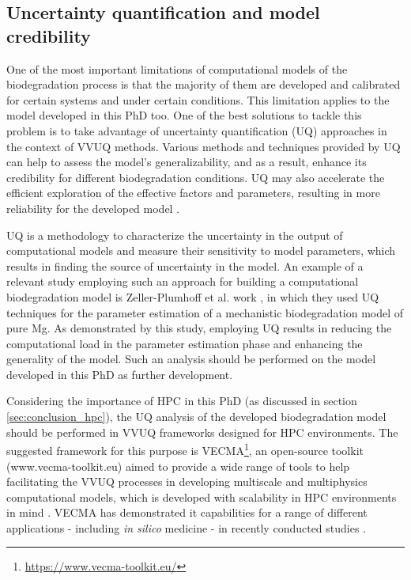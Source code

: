 \subsection{Uncertainty quantification and model credibility } \label{sec:conclusion_vvuq}


One of the most important limitations of computational models of the biodegradation process is that the majority of them are developed and calibrated for certain systems and under certain conditions. This limitation applies to the model developed in this PhD too. One of the best solutions to tackle this problem is to take advantage of uncertainty quantification (\gls{UQ}) approaches in the context of VVUQ methods. Various methods and techniques provided by UQ can help to assess the model's generalizability, and as a result, enhance its credibility for different biodegradation conditions. UQ may also accelerate the efficient exploration of the effective factors and parameters, resulting in more reliability for the developed model \cite{Albaraghtheh2022}.

UQ is a methodology to characterize the uncertainty in the output of computational models and measure their sensitivity to model parameters, which results in finding the source of uncertainty in the model. An example of a relevant study employing such an approach for building a computational biodegradation model is Zeller-Plumhoff et al. work \cite{Zeller-Plumhoff2022}, in which they used UQ techniques for the parameter estimation of a mechanistic biodegradation model of pure Mg. As demonstrated by this study, employing UQ results in reducing the computational load in the parameter estimation phase and enhancing the generality of the model. Such an analysis should be performed on the model developed in this PhD as further development.

Considering the importance of HPC in this PhD (as discussed in section \ref{sec:conclusion_hpc}), the UQ analysis of the developed biodegradation model should be performed in VVUQ frameworks designed for HPC environments. The suggested framework for this purpose is VECMA\footnote{\url{https://www.vecma-toolkit.eu/}}, an open-source toolkit (www.vecma-toolkit.eu) aimed to provide a wide range of tools to help facilitating the VVUQ processes in developing multiscale and multiphysics computational models, which is developed with scalability in HPC environments in mind \cite{Groen2021}. VECMA has demonstrated it capabilities for a range of different applications - including \textit{in silico} medicine - in recently conducted studies \cite{Suleimenova2021,Suter2021,Vassaux2021,Coveney2021}.


